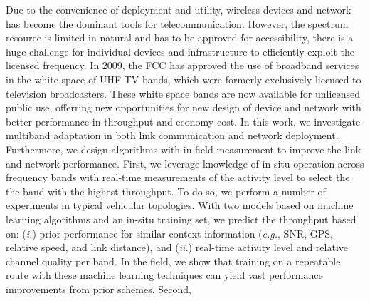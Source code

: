 Due to the convenience of deployment and utility, wireless devices and network
has become the dominant tools for telecommunication. However, the spectrum resource
is limited in natural and has to be approved for accessibility, there is a huge challenge 
for individual devices and infrastructure to efficiently exploit the licensed 
frequency. 
In 2009, the FCC has approved the use of broadband services in the white space 
of UHF TV bands, which were formerly exclusively licensed to television broadcasters.
These white space bands are now available for unlicensed public use, offerring
new opportunities for new design of device and network with better performance in 
throughput and economy cost. In this work, we investigate multiband adaptation
in both link communication and network deployment. Furthermore, we design algorithms
with in-field measurement to improve the link and network performance.
First, 
we leverage knowledge of in-situ operation
across frequency bands with real-time measurements of the activity level to 
select the the band with the highest throughput. To do so, we
perform a number of experiments in typical vehicular topologies. With two
models based on machine learning algorithms and an in-situ training set, we 
predict the throughput based on: ({\it i.}) prior performance for similar
context information ({\it e.g.}, SNR, GPS, relative speed, and link distance),
and ({\it ii.}) real-time activity level and relative channel quality per band.
In the field, we show that training on a repeatable route with these machine
learning techniques can yield vast performance improvements from prior schemes. 
Second, 
